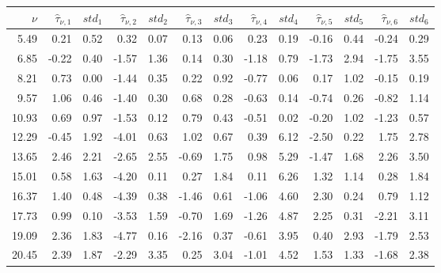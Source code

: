\documentclass{article}
\begin{document}
\begin{tabular}{rrrrrrrrrrrrr}\hline 
 $\nu$ & $\widehat{\tau}_{\nu,1}$ & $std_1$ & $\widehat{\tau}_{\nu,2}$ & $std_2$ & $\widehat{\tau}_{\nu,3}$ & $std_3$ & $\widehat{\tau}_{\nu,4}$ & $std_4$ &  $\widehat{\tau}_{\nu,5}$ & $std_5$ & $\widehat{\tau}_{\nu,6}$ & $std_6$ \\ \hline 
    5.49 &     0.21 &     0.52 &     0.32 &     0.07  &     0.13 &     0.06 &     0.23 &     0.19 &    -0.16 &     0.44  &    -0.24 &     0.29  \\ 
    6.85 &    -0.22 &     0.40 &    -1.57 &     1.36  &     0.14 &     0.30 &    -1.18 &     0.79 &    -1.73 &     2.94  &    -1.75 &     3.55  \\ 
    8.21 &     0.73 &     0.00 &    -1.44 &     0.35  &     0.22 &     0.92 &    -0.77 &     0.06 &     0.17 &     1.02  &    -0.15 &     0.19  \\ 
    9.57 &     1.06 &     0.46 &    -1.40 &     0.30  &     0.68 &     0.28 &    -0.63 &     0.14 &    -0.74 &     0.26  &    -0.82 &     1.14  \\ 
   10.93 &     0.69 &     0.97 &    -1.53 &     0.12  &     0.79 &     0.43 &    -0.51 &     0.02 &    -0.20 &     1.02  &    -1.23 &     0.57  \\ 
   12.29 &    -0.45 &     1.92 &    -4.01 &     0.63  &     1.02 &     0.67 &     0.39 &     6.12 &    -2.50 &     0.22  &     1.75 &     2.78  \\ 
   13.65 &     2.46 &     2.21 &    -2.65 &     2.55  &    -0.69 &     1.75 &     0.98 &     5.29 &    -1.47 &     1.68  &     2.26 &     3.50  \\ 
   15.01 &     0.58 &     1.63 &    -4.20 &     0.11  &     0.27 &     1.84 &     0.11 &     6.26 &     1.32 &     1.14  &     0.28 &     1.84  \\ 
   16.37 &     1.40 &     0.48 &    -4.39 &     0.38  &    -1.46 &     0.61 &    -1.06 &     4.60 &     2.30 &     0.24  &     0.79 &     1.12  \\ 
   17.73 &     0.99 &     0.10 &    -3.53 &     1.59  &    -0.70 &     1.69 &    -1.26 &     4.87 &     2.25 &     0.31  &    -2.21 &     3.11  \\ 
   19.09 &     2.36 &     1.83 &    -4.77 &     0.16  &    -2.16 &     0.37 &    -0.61 &     3.95 &     0.40 &     2.93  &    -1.79 &     2.53  \\ 
   20.45 &     2.39 &     1.87 &    -2.29 &     3.35  &     0.25 &     3.04 &    -1.01 &     4.52 &     1.53 &     1.33  &    -1.68 &     2.38  \\ 

\end{tabular}
\end{document}
